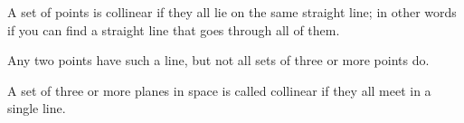 A set of points is collinear if they all lie on the same
straight line; in other words if you can find a straight line
that goes through all of them.
\par
Any two points have such a line, but not all sets of three or more
points do.
\par
A set of three or more planes in space is called collinear if they
all meet in a single line.